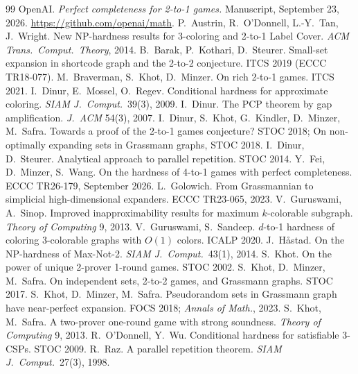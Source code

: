 \documentclass[11pt]{article}
\theoremstyle{definition}
\theoremstyle{remark}
\begin{document}
\begin{thebibliography}{99}\small
{} OpenAI. \emph{Perfect completeness for 2-to-1 games.} Manuscript, September 23, 2026. \url{https://github.com/openai/math}.
 P.~Austrin, R.~O'Donnell, L.-Y.~Tan, J.~Wright. New NP-hardness results for 3-coloring and 2-to-1 Label Cover. \emph{ACM Trans.\ Comput.\ Theory}, 2014.
 B.~Barak, P.~Kothari, D.~Steurer. Small-set expansion in shortcode graph and the 2-to-2 conjecture. ITCS 2019 (ECCC TR18-077).
 M.~Braverman, S.~Khot, D.~Minzer. On rich 2-to-1 games. ITCS 2021.
 I.~Dinur, E.~Mossel, O.~Regev. Conditional hardness for approximate coloring. \emph{SIAM J.\ Comput.}\ 39(3), 2009.
 I.~Dinur. The PCP theorem by gap amplification. \emph{J.\ ACM} 54(3), 2007.
 I.~Dinur, S.~Khot, G.~Kindler, D.~Minzer, M.~Safra. Towards a proof of the 2-to-1 games conjecture? STOC 2018; On non-optimally expanding sets in Grassmann graphs, STOC 2018.
 I.~Dinur, D.~Steurer. Analytical approach to parallel repetition. STOC 2014.
 Y.~Fei, D.~Minzer, S.~Wang. On the hardness of 4-to-1 games with perfect completeness. ECCC TR26-179, September 2026.
 L.~Golowich. From Grassmannian to simplicial high-dimensional expanders. ECCC TR23-065, 2023.
 V.~Guruswami, A.~Sinop. Improved inapproximability results for maximum $k$-colorable subgraph. \emph{Theory of Computing} 9, 2013.
 V.~Guruswami, S.~Sandeep. $d$-to-1 hardness of coloring 3-colorable graphs with $O(1)$ colors. ICALP 2020.
 J.~H{\aa}stad. On the NP-hardness of Max-Not-2. \emph{SIAM J.\ Comput.}\ 43(1), 2014.
 S.~Khot. On the power of unique 2-prover 1-round games. STOC 2002.
 S.~Khot, D.~Minzer, M.~Safra. On independent sets, 2-to-2 games, and Grassmann graphs. STOC 2017.
 S.~Khot, D.~Minzer, M.~Safra. Pseudorandom sets in Grassmann graph have near-perfect expansion. FOCS 2018; \emph{Annals of Math.}, 2023.
 S.~Khot, M.~Safra. A two-prover one-round game with strong soundness. \emph{Theory of Computing} 9, 2013.
 R.~O'Donnell, Y.~Wu. Conditional hardness for satisfiable 3-CSPs. STOC 2009.
 R.~Raz. A parallel repetition theorem. \emph{SIAM J.\ Comput.}\ 27(3), 1998.
\end{thebibliography}
\end{document}
